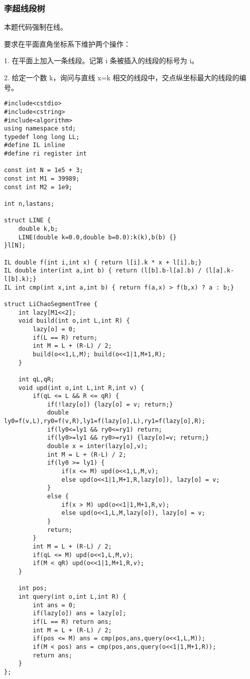 \documentclass[UTF8]{ctexart}
\begin{document}
\subsubsection{李超线段树}
本题代码强制在线。

要求在平面直角坐标系下维护两个操作：

1. 在平面上加入一条线段。记第 i 条被插入的线段的标号为 i。

2. 给定一个数 k，询问与直线 x=k 相交的线段中，交点纵坐标最大的线段的编号。
\begin{framed}
\begin{lstlisting}
#include<cstdio>
#include<cstring>
#include<algorithm>
using namespace std;
typedef long long LL;
#define IL inline
#define ri register int

const int N = 1e5 + 3;
const int M1 = 39989;
const int M2 = 1e9;

int n,lastans;

struct LINE {
    double k,b;
    LINE(double k=0.0,double b=0.0):k(k),b(b) {}
}l[N];

IL double f(int i,int x) { return l[i].k * x + l[i].b;}
IL double inter(int a,int b) { return (l[b].b-l[a].b) / (l[a].k-l[b].k);}
IL int cmp(int x,int a,int b) { return f(a,x) > f(b,x) ? a : b;}

struct LiChaoSegmentTree {
    int lazy[M1<<2];
    void build(int o,int L,int R) {
        lazy[o] = 0;
        if(L == R) return;
        int M = L + (R-L) / 2;
        build(o<<1,L,M); build(o<<1|1,M+1,R);
    }
    
    int qL,qR;
    void upd(int o,int L,int R,int v) {
        if(qL <= L && R <= qR) {
            if(!lazy[o]) {lazy[o] = v; return;}
            double ly0=f(v,L),ry0=f(v,R),ly1=f(lazy[o],L),ry1=f(lazy[o],R);
            if(ly0<=ly1 && ry0<=ry1) return;
            if(ly0>=ly1 && ry0>=ry1) {lazy[o]=v; return;}
            double x = inter(lazy[o],v);
            int M = L + (R-L) / 2;
            if(ly0 >= ly1) {
                if(x <= M) upd(o<<1,L,M,v);
                else upd(o<<1|1,M+1,R,lazy[o]), lazy[o] = v;
            }
            else {
                if(x > M) upd(o<<1|1,M+1,R,v);
                else upd(o<<1,L,M,lazy[o]), lazy[o] = v;
            }
            return;
        }
        int M = L + (R-L) / 2;
        if(qL <= M) upd(o<<1,L,M,v);
        if(M < qR) upd(o<<1|1,M+1,R,v);
    }
    
    int pos;
    int query(int o,int L,int R) {
        int ans = 0;
        if(lazy[o]) ans = lazy[o];
        if(L == R) return ans;
        int M = L + (R-L) / 2;
        if(pos <= M) ans = cmp(pos,ans,query(o<<1,L,M));
        if(M < pos) ans = cmp(pos,ans,query(o<<1|1,M+1,R));
        return ans;
    }
};


\end{lstlisting}
\end{framed}
\end{document}
